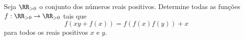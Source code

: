 Seja $\RR_{>0}$ o conjunto dos números reais positivos. Determine todas as funções $f: \RR_{>0} \to \RR_{>0}$ tais que
\[ f( xy + f(x) ) = f(f(x)f(y)) + x\]
para todos os reais positivos $x$ e $y$.
